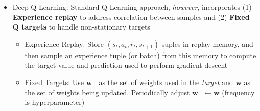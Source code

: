 \documentclass[twocolumn]{article}
\providecommand{\tightlist}{%
  \setlength{\itemsep}{\GlobalItemSep}\setlength{\parskip}{\GlobalListParSkip}}
\newlength{\GlobalItemSep}
\newlength{\GlobalListParSkip}
\providecommand{\bold}[1]{\mathbf{#1}}
\begin{document}
\begin{itemize}
  \begin{itemize}
  \tightlist
  \item
    LSMC:
    \(0 = \sum_{t=1}^T \alpha(G_t - \hat{v}(S_t, \bold{w}))\bold{x}(S_t)\)

    \begin{itemize}
    \tightlist
    \item
      \(\bold{w} = (\sum_{t=1}^T \bold{x}(S_t) \bold{x}(S_t)^T)^{-1} \sum_{t=1}^T \bold{x}(S_t)G_t\)
    \end{itemize}
  \item
    LSTD:
    \(0 = \sum_{t=1}^T \alpha(R_{t+1} + \gamma \hat{v}(S_{t+1}, \bold{w}) - \hat{v}(S_t, \bold{w}))\bold{x}(S_t)\)

    \begin{itemize}
    \tightlist
    \item
      \(\bold{w} = (\sum_{t=1}^T \bold{x}(S_t) \bold{x}(S_t)^T - \gamma \bold{x}(S_{t+1}))^{-1} \sum_{t=1}^T \bold{x}(S_t)R_{t+1}\)
    \end{itemize}
  \item
    LSDQ:
    \(0 = \sum_{t=1}^T \alpha(R_{t+1} + \gamma \hat{q} (S_{t+1}, \pi (S_{t+1}), \bold{w}) - \hat{q} (S_t, A_t, \bold{w}))\bold{x} (S_t, A_t)\)

    \begin{itemize}
    \tightlist
    \item
      \(\bold{w} = (\sum_{t=1}^T \bold{x} (S_t, A_t)(\bold{x} (S_t, A_t) - \gamma \bold{x} (S_{t+1}, \pi (S_{t+1})))^T)^{-1} \sum_{t=1}^T \bold{x} (S_t, A_t) R_{t+1}\)
    \item
      Sample \(S_t, A_t, R_{t+1}, S_{t+1}\) from old policy to generate
      an experience replay
    \end{itemize}
  \end{itemize}
\item
  Deep Q-Learning: Standard Q-Learning approach, \emph{however},
  incorporates (1) \textbf{Experience replay} to address correlation
  between samples and (2) \textbf{Fixed Q targets} to handle
  non-stationary targets

  \begin{itemize}
  \tightlist
  \item
    Experience Replay: Store \((s_t, a_t, r_t, s_{t+1})\) suples in
    replay memory, and then sample an experience tuple (or batch) from
    this memory to compute the target value and prediction used to
    perform gradient descent
  \item
    Fixed Targets: Use \(\bold{w^-}\) as the set of weights used in the
    \emph{target} and \(\bold{w}\) as the set of weights being updated.
    Periodically adjust \(\bold{w^-} \leftarrow \bold{w}\) (frequency is
    hyperparameter)


\end{itemize}
\end{itemize}
\end{document}
